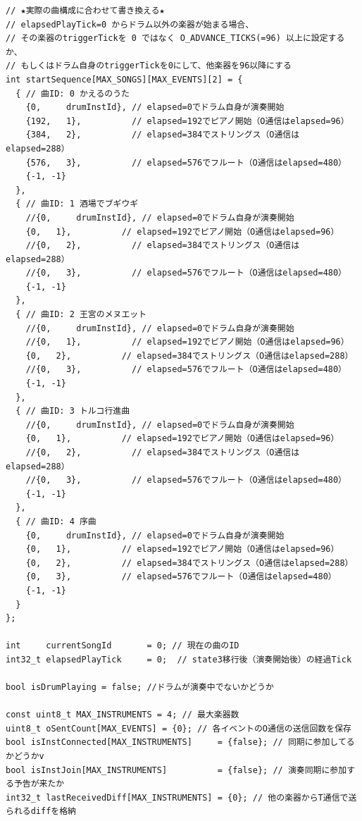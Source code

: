 \begin{lstlisting}[caption={drum\_0706.ino（楽譜データは冒頭2小節のみ掲載）}, label={lst:douki_drum_full}]
// ★実際の曲構成に合わせて書き換える★
// elapsedPlayTick=0 からドラム以外の楽器が始まる場合、
// その楽器のtriggerTickを 0 ではなく O_ADVANCE_TICKS(=96) 以上に設定するか、
// もしくはドラム自身のtriggerTickを0にして、他楽器を96以降にする
int startSequence[MAX_SONGS][MAX_EVENTS][2] = {
  { // 曲ID: 0 かえるのうた
    {0,     drumInstId}, // elapsed=0でドラム自身が演奏開始
    {192,   1},          // elapsed=192でピアノ開始（O通信はelapsed=96）
    {384,   2},          // elapsed=384でストリングス（O通信はelapsed=288）
    {576,   3},          // elapsed=576でフルート（O通信はelapsed=480）
    {-1, -1}
  },
  { // 曲ID: 1 酒場でブギウギ
    //{0,     drumInstId}, // elapsed=0でドラム自身が演奏開始
    {0,   1},          // elapsed=192でピアノ開始（O通信はelapsed=96）
    //{0,   2},          // elapsed=384でストリングス（O通信はelapsed=288）
    //{0,   3},          // elapsed=576でフルート（O通信はelapsed=480）
    {-1, -1}
  },
  { // 曲ID: 2 王宮のメヌエット
    //{0,     drumInstId}, // elapsed=0でドラム自身が演奏開始
    //{0,   1},          // elapsed=192でピアノ開始（O通信はelapsed=96）
    {0,   2},          // elapsed=384でストリングス（O通信はelapsed=288）
    //{0,   3},          // elapsed=576でフルート（O通信はelapsed=480）
    {-1, -1}
  },
  { // 曲ID: 3 トルコ行進曲
    //{0,     drumInstId}, // elapsed=0でドラム自身が演奏開始
    {0,   1},          // elapsed=192でピアノ開始（O通信はelapsed=96）
    //{0,   2},          // elapsed=384でストリングス（O通信はelapsed=288）
    //{0,   3},          // elapsed=576でフルート（O通信はelapsed=480）
    {-1, -1}
  },
  { // 曲ID: 4 序曲
    {0,     drumInstId}, // elapsed=0でドラム自身が演奏開始
    {0,   1},          // elapsed=192でピアノ開始（O通信はelapsed=96）
    {0,   2},          // elapsed=384でストリングス（O通信はelapsed=288）
    {0,   3},          // elapsed=576でフルート（O通信はelapsed=480）
    {-1, -1}
  }
};

int     currentSongId       = 0; // 現在の曲のID
int32_t elapsedPlayTick     = 0;  // state3移行後（演奏開始後）の経過Tick

bool isDrumPlaying = false; //ドラムが演奏中でないかどうか

const uint8_t MAX_INSTRUMENTS = 4; // 最大楽器数
uint8_t oSentCount[MAX_EVENTS] = {0}; // 各イベントのO通信の送信回数を保存
bool isInstConnected[MAX_INSTRUMENTS]     = {false}; // 同期に参加してるかどうかv
bool isInstJoin[MAX_INSTRUMENTS]          = {false}; // 演奏同期に参加する予告が来たか
int32_t lastReceivedDiff[MAX_INSTRUMENTS] = {0}; // 他の楽器からT通信で送られるdiffを格納


\end{lstlisting}
